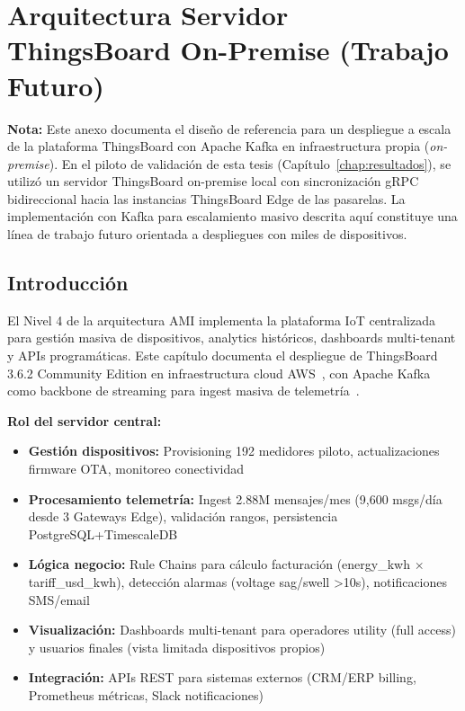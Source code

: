 ﻿\chapter{Arquitectura Servidor ThingsBoard On-Premise (Trabajo Futuro)}
\label{chap:server-thingsboard}


\textbf{Nota:} Este anexo documenta el diseño de referencia para un despliegue a escala de la plataforma ThingsBoard con Apache Kafka en infraestructura propia (\textit{on-premise}). En el piloto de validación de esta tesis (Capítulo~\ref{chap:resultados}), se utilizó un servidor ThingsBoard on-premise local con sincronización gRPC bidireccional hacia las instancias ThingsBoard Edge de las pasarelas. La implementación con Kafka para escalamiento masivo descrita aquí constituye una línea de trabajo futuro orientada a despliegues con miles de dispositivos.

\section{Introducción}
\label{sec:server-intro}

El Nivel 4 de la arquitectura AMI implementa la plataforma IoT centralizada para gestión masiva de dispositivos, analytics históricos, dashboards multi-tenant y APIs programáticas. Este capítulo documenta el despliegue de ThingsBoard 3.6.2 Community Edition en infraestructura cloud AWS~\cite{thingsboardCloudArchitecture2024}, con Apache Kafka como backbone de streaming para ingest masiva de telemetría~\cite{apacheKafkaDocumentation2024}.

\textbf{Rol del servidor central:}

\begin{itemize}
    \item \textbf{Gestión dispositivos:} Provisioning 192 medidores piloto, actualizaciones firmware OTA, monitoreo conectividad
    \item \textbf{Procesamiento telemetría:} Ingest 2.88M mensajes/mes (9,600 msgs/día desde 3 Gateways Edge), validación rangos, persistencia PostgreSQL+TimescaleDB
    \item \textbf{Lógica negocio:} Rule Chains para cálculo facturación (energy\_kwh $\times$ tariff\_usd\_kwh), detección alarmas (voltage sag/swell >10s), notificaciones SMS/email
    \item \textbf{Visualización:} Dashboards multi-tenant para operadores utility (full access) y usuarios finales (vista limitada dispositivos propios)
    \item \textbf{Integración:} APIs REST para sistemas externos (CRM/ERP billing, Prometheus métricas, Slack notificaciones)
\end{itemize}

